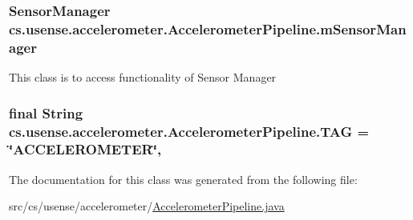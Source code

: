 \subsubsection[{m\+Sensor\+Manager}]{\setlength{\rightskip}{0pt plus 5cm}Sensor\+Manager cs.\+usense.\+accelerometer.\+Accelerometer\+Pipeline.\+m\+Sensor\+Manager\hspace{0.3cm}{\ttfamily [private]}}\label{classcs_1_1usense_1_1accelerometer_1_1_accelerometer_pipeline_acf371fb0c0f08ab072a1c4dcaf142467}
This class is to access functionality of Sensor Manager \hypertarget{classcs_1_1usense_1_1accelerometer_1_1_accelerometer_pipeline_a9529f85cce0a73aef1acb8c643b470d7}{}
\subsubsection[{T\+A\+G}]{\setlength{\rightskip}{0pt plus 5cm}final String cs.\+usense.\+accelerometer.\+Accelerometer\+Pipeline.\+T\+A\+G = \char`\"{}A\+C\+C\+E\+L\+E\+R\+O\+M\+E\+T\+E\+R\char`\"{}\hspace{0.3cm}{\ttfamily [static]}, {\ttfamily [private]}}\label{classcs_1_1usense_1_1accelerometer_1_1_accelerometer_pipeline_a9529f85cce0a73aef1acb8c643b470d7}


The documentation for this class was generated from the following file\+:\begin{DoxyCompactItemize}
\item 
src/cs/usense/accelerometer/\hyperlink{_accelerometer_pipeline_8java}{Accelerometer\+Pipeline.\+java}\end{DoxyCompactItemize}
